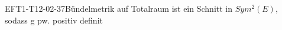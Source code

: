
\begin{DEF}{EFT1-T12-02-37}{Bündelmetrik auf Totalraum ist ein Schnitt in $Sym^2(E)$, sodass g pw. positiv definit}
\end{DEF}

